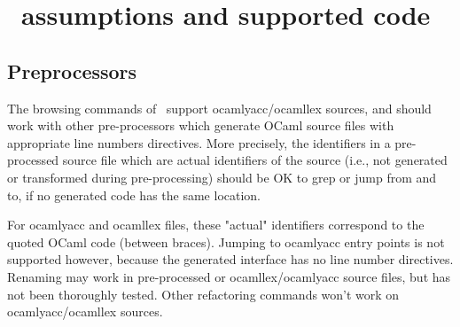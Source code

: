 



\section{\typerex\ assumptions and supported code}

\subsection{Preprocessors}

The browsing commands of \typerex\ support ocamlyacc/ocamllex sources,
and should work with other pre-processors which generate OCaml source
files with appropriate line numbers directives.
%
More precisely, the identifiers in a pre-processed source file which are
actual identifiers of the source (i.e., not generated or transformed during
pre-processing) should be OK to grep or jump from and to, if no
generated code has the same location.

For ocamlyacc and ocamllex files, these "actual" identifiers correspond to
the quoted OCaml code (between braces). Jumping to ocamlyacc entry
points is not supported however, because the generated interface has
no line number directives.
%
Renaming may work in pre-processed or ocamllex/ocamlyacc source files,
but has not been thoroughly tested. Other refactoring commands won't
work on ocamlyacc/ocamllex sources.

